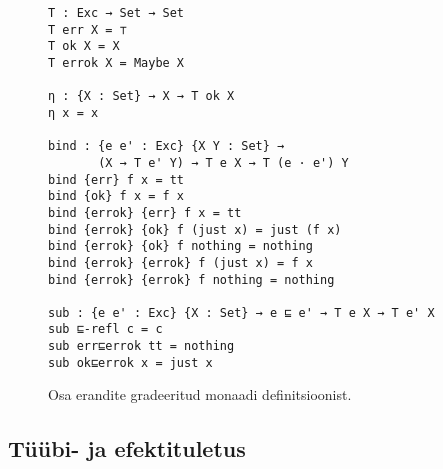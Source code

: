\documentclass[a4paper,12pt]{article}
\begin{document}
\begin{figure}
  \begin{BVerbatim}
T : Exc → Set → Set
T err X = ⊤
T ok X = X
T errok X = Maybe X

η : {X : Set} → X → T ok X
η x = x
  
bind : {e e' : Exc} {X Y : Set} →
       (X → T e' Y) → T e X → T (e · e') Y
bind {err} f x = tt
bind {ok} f x = f x
bind {errok} {err} f x = tt
bind {errok} {ok} f (just x) = just (f x)
bind {errok} {ok} f nothing = nothing
bind {errok} {errok} f (just x) = f x
bind {errok} {errok} f nothing = nothing

sub : {e e' : Exc} {X : Set} → e ⊑ e' → T e X → T e' X
sub ⊑-refl c = c
sub err⊑errok tt = nothing
sub ok⊑errok x = just x
  \end{BVerbatim}
  \caption{Osa erandite gradeeritud monaadi definitsioonist.}
  \label{fig:exc.graded-monad}
\end{figure}

\subsection{Tüübi- ja efektituletus}\label{ssec:exc.inference}
\end{document}
